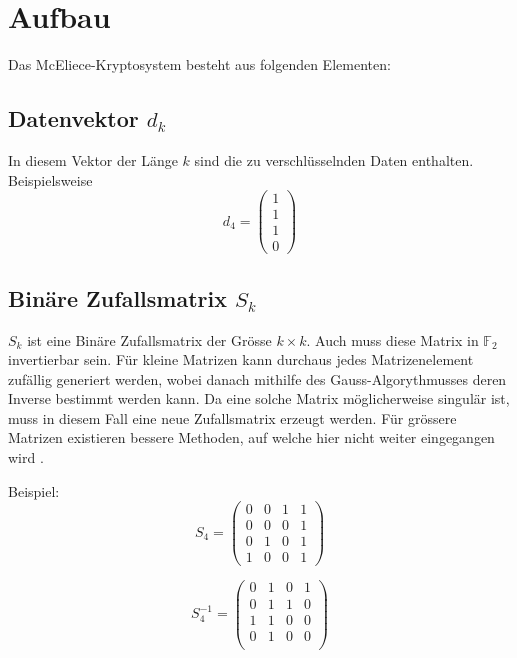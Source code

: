 %
%
%
\section{Aufbau\label{mceliece:section:Aufbau}}
Das McEliece-Kryptosystem besteht aus folgenden Elementen:

\subsection{Datenvektor $d_k$
\label{mceliece:subsection:d_k}}
In diesem Vektor der Länge $k$ sind die zu verschlüsselnden Daten enthalten.
Beispielsweise
\[d_4=
\begin{pmatrix}
    1\\
    1\\
    1\\
    0 
\end{pmatrix}
\]

\subsection{Binäre Zufallsmatrix $S_k$
\label{mceliece:subsection:s_k}}
$S_k$ ist eine Binäre Zufallsmatrix der Grösse $k \times k$.
Auch muss diese Matrix in $\mathbb{F}_2$ invertierbar sein.
Für kleine Matrizen kann durchaus jedes Matrizenelement zufällig generiert werden,
wobei danach mithilfe des Gauss-Algorythmusses deren Inverse bestimmt werden kann.
Da eine solche Matrix möglicherweise singulär ist, muss in diesem Fall eine neue Zufallsmatrix erzeugt werden.
Für grössere Matrizen existieren bessere Methoden, auf welche hier nicht weiter eingegangen wird \cite{mceliece:GenerationRandMatrix}.

Beispiel:
\[S_4=
    \begin{pmatrix}
        0 & 0 & 1 & 1\\
        0 & 0 & 0 & 1\\
        0 & 1 & 0 & 1\\
        1 & 0 & 0 & 1
    \end{pmatrix}
\]

\[
    S_4^{-1}=
    \begin{pmatrix}
        0 & 1 & 0 & 1\\
        0 & 1 & 1 & 0\\
        1 & 1 & 0 & 0\\
        0 & 1 & 0 & 0\\
    \end{pmatrix}
\]

